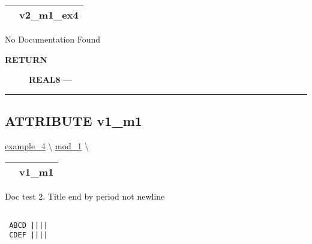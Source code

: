 {\renewcommand{\arraystretch}{1.5}
\begin{tabularx}{\textwidth}{|>{\raggedright\arraybackslash}l|X|}
\hline
\hspace{0pt}\mytexttt{\color{red} } & \textbf{v2\_m1\_ex4} \\
\hline
\end{tabularx}
}

\par





No Documentation Found








\par
\begin{description}
\item [\colorbox{tagtype}{\color{white} \textbf{\textsf{RETURN}}}] \textbf{REAL8} --- 
\end{description}




\rule{\linewidth}{0.5pt}
\subsection*{\textsf{\colorbox{headtoc}{\color{white} ATTRIBUTE}
v1\_m1}}

\hypertarget{ecldoc:example_3.mod_1.v1_m1}{}
\hspace{0pt} \hyperlink{ecldoc:intest.example_4}{example_4} \textbackslash 
\hspace{0pt} \hyperlink{ecldoc:intest.example_4.mod_1}{mod_1} \textbackslash 

{\renewcommand{\arraystretch}{1.5}
\begin{tabularx}{\textwidth}{|>{\raggedright\arraybackslash}l|X|}
\hline
\hspace{0pt}\mytexttt{\color{red} } & \textbf{v1\_m1} \\
\hline
\end{tabularx}
}

\par





Doc test 2. Title end by period not newline 
\begin{verbatim}

 ABCD ||||
 CDEF ||||\end{verbatim}










